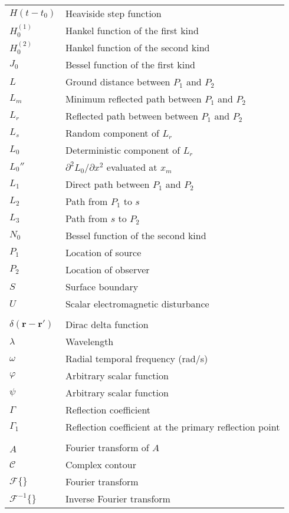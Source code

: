 \begin{supertabular}{ll}
$H(t-t_0)$ & Heaviside step function \\
$H_0^{(1)}$ & Hankel function of the first kind \\
$H_0^{(2)}$ & Hankel function of the second kind \\
$J_0$ & Bessel function of the first kind \\
$L$ & Ground distance between $P_1$ and $P_2$\\
$L_m$ & Minimum reflected path between $P_1$ and $P_2$\\
$L_r$ & Reflected path between between $P_1$ and $P_2$\\
$L_s$ & Random component of $L_r$\\
$L_0$ & Deterministic component of $L_r$\\
$L_0''$ & $\partial^2 L_0 /\partial x^2$ evaluated at $x_m$\\
$L_1$ & Direct path between $P_1$ and $P_2$\\
$L_2$ & Path from $P_1$ to $s$\\
$L_3$ & Path from $s$ to $P_2$\\
$N_0$ & Bessel function of the second kind \\
$P_1$ & Location of source\\
$P_2$ & Location of observer\\
$S$ & Surface boundary \\
$U$ & Scalar electromagnetic disturbance\\
\\
$\delta\left(\mathbf{r}-\mathbf{r}' \right)$ & Dirac delta function \\
$\lambda$ & Wavelength\\
$\omega$ & Radial temporal frequency (rad/s)\\
$\varphi$ & Arbitrary scalar function\\
$\psi$ & Arbitrary scalar function\\
$\Gamma$ & Reflection coefficient\\
$\Gamma_1$ & Reflection coefficient at the primary reflection point\\
\\
$\hat{A}$ & Fourier transform of $A$ \\
$\mathcal{C}$ & Complex contour \\
$\mathcal{F}\{\}$ & Fourier transform \\
$\mathcal{F}^{-1}\{\}$ & Inverse Fourier transform \\
\end{supertabular}